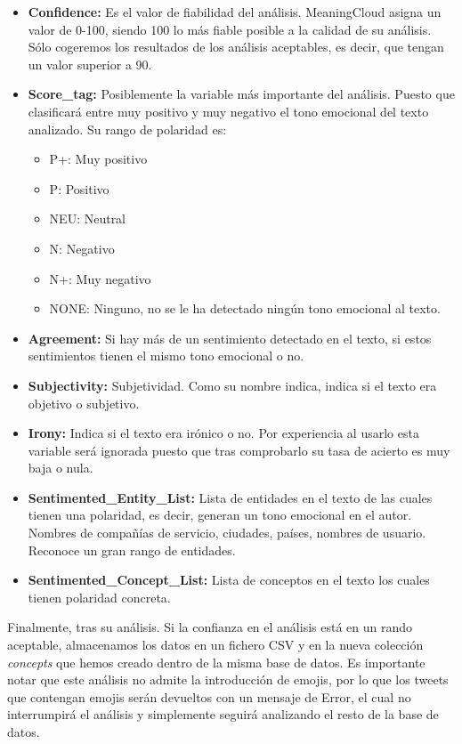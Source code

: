 \begin{itemize}
	\item \textbf{Confidence:} Es el valor de fiabilidad del análisis. MeaningCloud asigna un valor de 0-100, siendo 100 lo más fiable posible a la calidad de su análisis. Sólo cogeremos los resultados de los análisis aceptables, es decir, que tengan un valor superior a 90.
	\item \textbf{Score\_tag:} Posiblemente la variable más importante del análisis. Puesto que clasificará entre muy positivo y muy negativo el tono emocional del texto analizado. Su rango de polaridad es: 
	\begin{itemize}
		\item P+: Muy positivo
		\item P: Positivo
		\item NEU: Neutral
		\item N: Negativo
		\item N+: Muy negativo
		\item NONE: Ninguno, no se le ha detectado ningún tono emocional al texto.
	\end{itemize}
	\item \textbf{Agreement:} Si hay más de un sentimiento detectado en el texto, si estos sentimientos tienen el mismo tono emocional o no. 
	\item \textbf{Subjectivity:} Subjetividad. Como su nombre indica, indica si el texto era objetivo o subjetivo.
	\item \textbf{Irony:} Indica si el texto era irónico o no. Por experiencia al usarlo esta variable será ignorada puesto que tras comprobarlo su tasa de acierto es muy baja o nula. 
	\item \textbf{Sentimented\_Entity\_List:} Lista de entidades en el texto de las cuales tienen una polaridad, es decir, generan un tono emocional en el autor. Nombres de compañías de servicio, ciudades, países, nombres de usuario. Reconoce un gran rango de entidades. 
	\item \textbf{Sentimented\_Concept\_List:} Lista de conceptos en el texto los cuales tienen polaridad concreta. 
\end{itemize}

Finalmente, tras su análisis. Si la confianza en el análisis está en un rando aceptable, almacenamos los datos en un fichero CSV y en la nueva colección \textit{concepts} que hemos creado dentro de la misma base de datos. Es importante notar que este análisis no admite la introducción de emojis, por lo que los tweets que contengan emojis serán devueltos con un mensaje de Error, el cual no interrumpirá el análisis y simplemente seguirá analizando el resto de la base de datos. 


